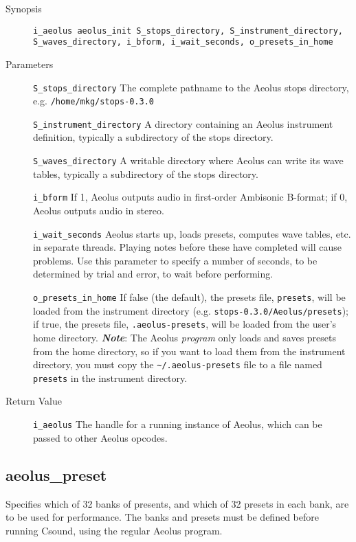 \documentclass[english,11pt,letterpaper,onecolumn]{scrartcl}
\begin{document}
{\begin{description}
	\item[Synopsis]
	\item[]\lstinline|i_aeolus aeolus_init S_stops_directory, S_instrument_directory, S_waves_directory, i_bform, i_wait_seconds, o_presets_in_home|
	\item[Parameters]
	\item[]\lstinline|S_stops_directory| The complete pathname to the Aeolus stops directory, e.g. \lstinline|/home/mkg/stops-0.3.0|
	\item[]\lstinline|S_instrument_directory| A directory containing an Aeolus instrument definition, typically a subdirectory of the stops directory.
	\item[]\lstinline|S_waves_directory| A writable directory where Aeolus can write its wave tables, typically a subdirectory of the stops directory.
	\item[]\lstinline|i_bform| If 1, Aeolus outputs audio in first-order Ambisonic B-format; if 0, Aeolus outputs audio in stereo.
	\item[]\lstinline|i_wait_seconds| Aeolus starts up, loads presets, computes wave tables, etc. in separate threads. Playing notes before these have completed will cause problems. Use this parameter to specify a number of seconds, to be determined by trial and error, to wait before performing.
	\item[]\lstinline|o_presets_in_home| If false (the default), the presets file, \lstinline|presets|, will be loaded from the instrument directory (e.g. \lstinline|stops-0.3.0/Aeolus/presets|); if true, the presets file, \lstinline|.aeolus-presets|, will be loaded from the user's home directory. \textit{\textbf{Note}}: The Aeolus \emph{program} only loads and saves presets from the home directory, so if you want to load them from the instrument directory, you must copy the \lstinline|~/.aeolus-presets| file to a file named \lstinline|presets| in the instrument directory.
	\item[Return Value]
	\item[]\lstinline|i_aeolus| The handle for a running instance of Aeolus, which can be passed to other Aeolus opcodes.
\end{description}

\subsection*{aeolus\_preset}

Specifies which of 32 banks of presents, and which of 32 presets in each bank, are to be used for performance. The banks and presets must be defined before running Csound, using the regular Aeolus program.

}
\end{document}
